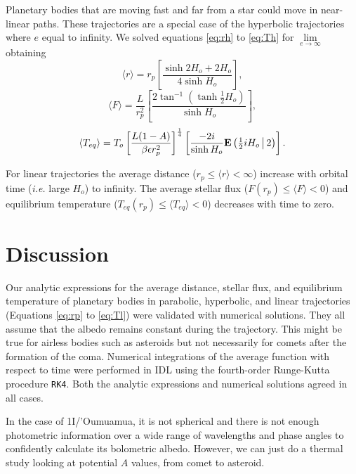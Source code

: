 \documentclass[a4paper,fleqn,usenatbib]{mnras}
\begin{document}
Planetary bodies that are moving fast and far from a star  could move in near-linear paths. These trajectories are a special case of the hyperbolic trajectories where $e$ equal to infinity. We solved equations \ref{eq:rh} to \ref{eq:Th} for $\lim\limits_{e \to \infty}$ obtaining
\begin{equation} \label{eq:rl}
\langle r \rangle = r_p \left[\frac{\sinh 2H_o  + 2H_o}{4 \sinh H_o } \right],
\end{equation}
\begin{equation} \label{eq:Fl}
\langle F \rangle = \frac{L}{r_p^2} \left[ \frac{2 \tan^{-1} \left( \tanh \frac{1}{2} H_o \right)}{\sinh H_o } \right],
\end{equation}
\begin{equation} \label{eq:Tl}
\langle T_{eq} \rangle = T_o \left[\frac{L {\left(1 - A\right)}}{\beta \epsilon r_p^{2}}\right]^{\frac{1}{4}} \left[ \frac{-2 i}{\sinh H_o } {\rm \mathbf{E}} \left(\tfrac{1}{2}iH_o\, \big| \,2 \right) \right].
\end{equation}

For linear trajectories the average distance ($r_p \leq \langle r \rangle < \infty$) increase with orbital time (\emph{i.e.} large $H_o$) to infinity. The average stellar flux ($F(r_p) \leq \langle F \rangle < 0$) and equilibrium temperature ($T_{eq}(r_p) \leq \langle T_{eq} \rangle < 0$) decreases with time to zero.


\section{Discussion}
\label{sec:discussion}

Our analytic expressions for the average distance, stellar flux, and equilibrium temperature of planetary bodies in parabolic, hyperbolic, and linear trajectories (Equations \ref{eq:rp} to \ref{eq:Tl}) were validated with numerical solutions. They all assume that the albedo remains constant during the trajectory. This might be true for airless bodies such as asteroids but not necessarily for comets after the formation of the coma. Numerical integrations of the average function with respect to time were performed in IDL using the fourth-order Runge-Kutta procedure \texttt{RK4}. Both the analytic expressions and numerical solutions agreed in all cases.

In the case of 1I/'Oumuamua, it is not spherical and there is not enough photometric information over a wide range of wavelengths and phase angles to confidently calculate its bolometric albedo. However, we can just do a thermal study looking at potential $A$ values, from comet to asteroid.
\end{document}
